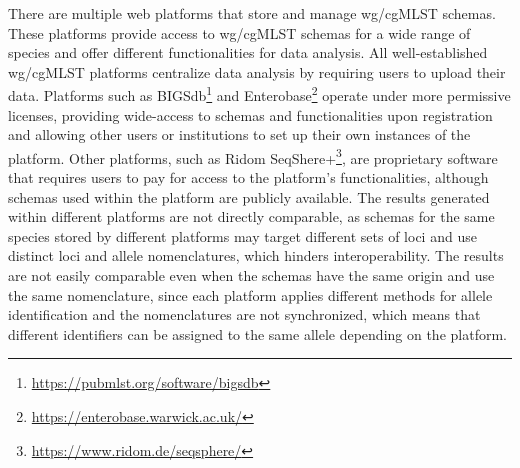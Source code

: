 There are multiple web platforms that store and manage \ac{wg/cgMLST} schemas. These platforms provide access to \ac{wg/cgMLST} schemas for a wide range of species and offer different functionalities for data analysis. All well-established \ac{wg/cgMLST} platforms centralize data analysis by requiring users to upload their data. Platforms such as \ac{BIGSdb}\footnote{\url{https://pubmlst.org/software/bigsdb}} and Enterobase\footnote{\url{https://enterobase.warwick.ac.uk/}} operate under more permissive licenses, providing wide-access to schemas and functionalities upon registration and allowing other users or institutions to set up their own instances of the platform. Other platforms, such as Ridom SeqShere+\footnote{\url{https://www.ridom.de/seqsphere/}}, are proprietary software that requires users to pay for access to the platform's functionalities, although schemas used within the platform are publicly available. The results generated within different platforms are not directly comparable, as schemas for the same species stored by different platforms may target different sets of loci and use distinct loci and allele nomenclatures, which hinders interoperability. The results are not easily comparable even when the schemas have the same origin and use the same nomenclature, since each platform applies different methods for allele identification and the nomenclatures are not synchronized, which means that different identifiers can be assigned to the same allele depending on the platform.

